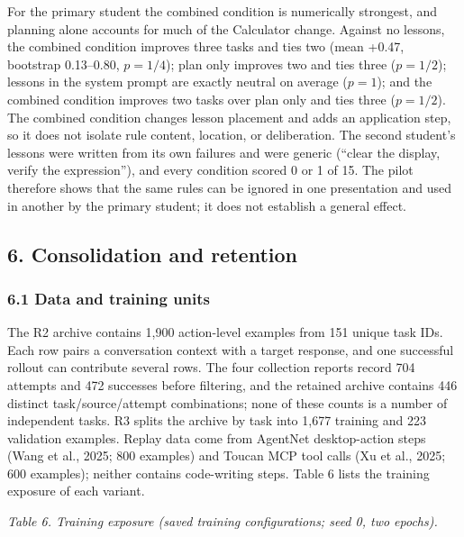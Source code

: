\documentclass[
  10pt,
]{article}
\newcounter{none} %
\begin{document}
For the primary student the combined condition is numerically strongest,
and planning alone accounts for much of the Calculator change. Against
no lessons, the combined condition improves three tasks and ties two
(mean +0.47, bootstrap 0.13--0.80, \(p=1/4\)); plan only improves two
and ties three (\(p=1/2\)); lessons in the system prompt are exactly
neutral on average (\(p=1\)); and the combined condition improves two
tasks over plan only and ties three (\(p=1/2\)). The combined condition
changes lesson placement and adds an application step, so it does not
isolate rule content, location, or deliberation. The second student's
lessons were written from its own failures and were generic (``clear the
display, verify the expression''), and every condition scored 0 or 1 of
15. The pilot therefore shows that the same rules can be ignored in one
presentation and used in another by the primary student; it does not
establish a general effect.

\subsection{6. Consolidation and
retention}\label{consolidation-and-retention}

\subsubsection{6.1 Data and training
units}\label{data-and-training-units}

The R2 archive contains 1,900 action-level examples from 151 unique task
IDs. Each row pairs a conversation context with a target response, and
one successful rollout can contribute several rows. The four collection
reports record 704 attempts and 472 successes before filtering, and the
retained archive contains 446 distinct task/source/attempt combinations;
none of these counts is a number of independent tasks. R3 splits the
archive by task into 1,677 training and 223 validation examples. Replay
data come from AgentNet desktop-action steps (Wang et al., 2025; 800
examples) and Toucan MCP tool calls (Xu et al., 2025; 600 examples);
neither contains code-writing steps. Table 6 lists the training exposure
of each variant.

\emph{Table 6. Training exposure (saved training configurations; seed 0,
two epochs).}
\end{document}
